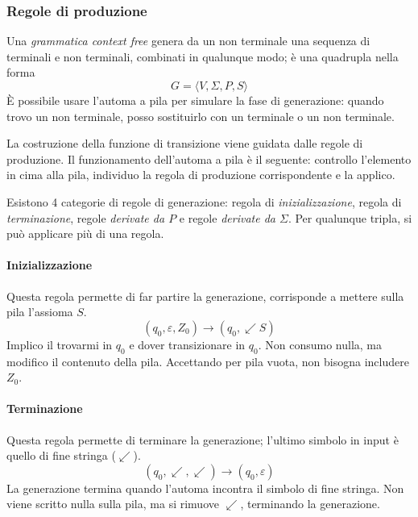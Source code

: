 \documentclass[11pt]{article}
\begin{document}
\subsubsection{Regole di produzione}
Una \textit{grammatica context free} genera da un non terminale una sequenza di terminali e non terminali, combinati in qualunque 
modo; è una quadrupla nella forma 
\begin{equation*}
    G=\langle V,\Sigma,P,S\rangle
\end{equation*}
È possibile usare l'automa a pila per simulare la fase di generazione: quando trovo un non terminale, posso sostituirlo 
con un terminale o un non terminale.

La costruzione della funzione di transizione viene guidata dalle regole di produzione.
Il funzionamento dell'automa a pila è il seguente: controllo l'elemento in cima alla pila, individuo la regola di produzione 
corrispondente e la applico. 

Esistono 4 categorie di regole di generazione: regola di \textit{inizializzazione}, regola di \textit{terminazione}, 
regole \textit{derivate da $P$} e regole \textit{derivate da $\Sigma$}.
Per qualunque tripla, si può applicare più di una regola.
\paragraph*{Inizializzazione}
Questa regola permette di far partire la generazione, corrisponde a mettere sulla pila l'assioma $S$.
\begin{equation*}
    (q_0,\varepsilon,Z_0)\rightarrow(q_0,\swarrow S)
\end{equation*}
Implico il trovarmi in $q_0$ e dover transizionare in $q_0$. Non consumo nulla, ma modifico il contenuto della pila. 
Accettando per pila vuota, non bisogna includere $Z_0$.
\paragraph*{Terminazione}
Questa regola permette di terminare la generazione; l'ultimo simbolo in input è quello di fine stringa ($\swarrow$).
\begin{equation*}
    (q_0,\swarrow,\swarrow)\rightarrow(q_0,\varepsilon)
\end{equation*}
La generazione termina quando l'automa incontra il simbolo di fine stringa. Non viene scritto nulla sulla pila, ma si rimuove 
$\swarrow$, terminando la generazione.
\end{document}

